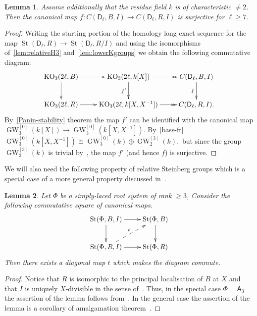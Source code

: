 \documentclass[oneside, 8pt]{amsart}
\newtheorem{lemma}{Lemma}
\theoremstyle{remark}
\theoremstyle{definition}
\numberwithin{lemma}{section}
\numberwithin{prop}{section}
\numberwithin{corollary}{section}
\numberwithin{externaltheorem}{section}
\DeclareMathOperator{\St}{St}
\DeclareMathOperator{\KO}{KO}
\DeclareMathOperator{\GW}{GW}
\newcommand{\rA}{\mathsf{A}}
\newcommand{\rD}{\mathsf{D}}
\numberwithin{equation}{section}
\begin{document}
\begin{lemma} \label{lem:prop41}
Assume additionally that the residue field $k$ is of characteristic $\neq 2$.
Then the canonical map $f\colon C(\rD_\ell, B, I) \to C(\rD_\ell, R, I)$ is surjective for $\ell \geq 7$. \end{lemma}
\begin{proof}
Writing the starting portion of the homology long exact sequence for the map $\St(\rD_\ell, R) \to \St(\rD_\ell, R/I)$ 
and using the isomorphisms of~\cref{lem:relativeH3} and~\cref{lem:lowerKgroups} we obtain the following commutative diagram:
\begin{equation*}\xymatrix{
 \KO_3(2\ell, B) \ar[r] \ar[d] & \KO_3(2\ell, k[X]) \ar[d]_{f'} \ar@{->>}[r] & \ar[d]_{f} C(\rD_\ell, B, I) \\
 \KO_3(2\ell, R) \ar[r]        & \KO_3(2\ell, k[X, X^{-1}]) \ar@{->>}[r]        & C(\rD_\ell, R, I).}\end{equation*}
By~\cref{Panin-stability} theorem the map $f'$ can be identified with the canonical map $\GW_3^{[0]}(k[X]) \to \GW_3^{[0]}(k[X, X^{-1}])$.
By~\cref{bass-ft} $\GW_3^{[0]}(k[X, X^{-1}]) \cong \GW_3^{[0]}(k) \oplus \GW_2^{[3]}(k),$
but since the group $\GW_2^{[3]}(k)$ is trivial by~\cite[Lemma~2.2]{FRS12}, the map $f'$ (and hence $f$) is surjective.
\end{proof} 
 
We will also need the following property of relative Steinberg groups which is a special case of a more general property discussed in~\cite[\S~2]{LS17}.
\begin{lemma}\label{lem:lemma32} Let $\Phi$ be a simply-laced root system of rank $\geq 3$,
Consider the following commutative square of canonical maps.
\[ \xymatrix{
    \St(\Phi, B, I) \ar[r] \ar[d] & \St(\Phi, B) \ar[d] \\
    \St(\Phi, R, I) \ar[r] \ar@{-->}^t[ur] & \St(\Phi, R) } \]
Then there exists a diagonal map $t$ which makes the diagram commute.   
\end{lemma} 
\begin{proof}
 Notice that $R$ is isomorphic to the principal localisation of $B$ at $X$
  and that $I$ is uniquely $X$-divisible in the sense of~\cite[\S~4]{LS17}.
 Thus, in the special case $\Phi = \rA_3$ the assertion of the lemma follows from~\cite[Theorem~3]{LS17}.
 In the general case the assertion of the lemma is a corollary of amalgamation theorem~\cite[Theorem~9]{S15}.
\end{proof}
\end{document}
